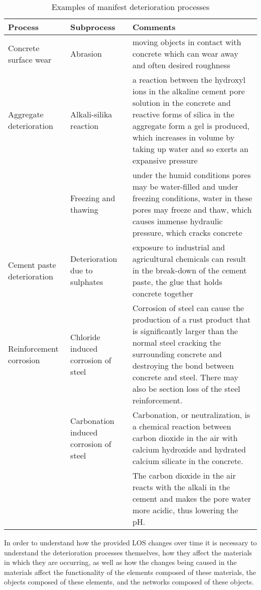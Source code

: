 \begin{table}
\caption{Examples of manifest deterioration processes}
\begin{tabular}{|l|p{120pt}|p{200pt}|}
\hline
Process & Subprocess & Comments \\ 
\hline
Concrete surface wear & Abrasion & moving objects in contact with concrete which can wear away and often desired roughness \\ 
\hline
Aggregate deterioration & Alkali-silika reaction & a reaction between the hydroxyl ions in the alkaline cement pore solution in the concrete and reactive forms of silica in the aggregate form a gel is produced, which increases in volume by taking up water and so exerts an expansive pressure \\ 
\cline{2-3}
 & Freezing and thawing & under the humid conditions pores may be water-filled and under freezing conditions, water in these pores may freeze and thaw, which causes immense hydraulic pressure, which cracks concrete \\ 
\hline
Cement paste deterioration & Deterioration due to sulphates  & exposure to industrial and agricultural chemicals can result in the break-down of the cement paste, the glue that holds concrete together \\ 
\hline
Reinforcement corrosion & Chloride induced corrosion of steel & Corrosion of steel can cause the production of a rust product that is significantly larger than the normal steel cracking the surrounding concrete and destroying the bond between concrete and steel. There may also be section loss of the steel reinforcement. \\ 
\cline{2-3}
 & Carbonation induced corrosion of steel & Carbonation, or neutralization, is a chemical reaction between carbon dioxide in the air with calcium hydroxide and hydrated calcium silicate in the concrete.  \\ 
 &  & The carbon dioxide in the air reacts with the alkali in the cement and makes the pore water more acidic, thus lowering the pH.  \\ 
\hline
\end{tabular}
\label{tbl:29}
\end{table}

In order to understand how the provided LOS changes over time it is necessary to understand the deterioration processes themselves, how they affect the materials in which they are occurring, as well as how the changes being caused in the materials affect the functionality of the elements composed of these materials, the objects composed of these elements, and the networks composed of these objects.

